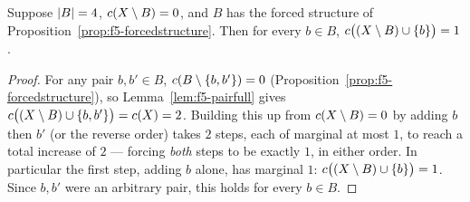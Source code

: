 \begin{proposition}
\label{prop:f5-case0}
Suppose $\left\lvert B\right\rvert = 4$, $c(X \setminus B) = 0$, and $B$ has the forced
structure of Proposition~\ref{prop:f5-forcedstructure}. Then for every
$b \in B$, $c\bigl((X \setminus B) \cup \left\{b\right\}\bigr) = 1$.
\end{proposition}

\begin{proof}
For any pair $b, b' \in B$, $c(B \setminus \left\{b,b'\right\}) = 0$
(Proposition~\ref{prop:f5-forcedstructure}), so
Lemma~\ref{lem:f5-pairfull} gives
$c\bigl((X\setminus B) \cup \left\{b,b'\right\}\bigr) = c(X) = 2$. Building this
up from $c(X \setminus B) = 0$ by adding $b$ then $b'$ (or the reverse
order) takes $2$ steps, each of marginal at most $1$, to reach a total
increase of $2$ --- forcing \emph{both} steps to be exactly $1$, in either
order. In particular the first step, adding $b$ alone, has marginal $1$:
$c\bigl((X\setminus B)\cup\left\{b\right\}\bigr) = 1$. Since $b,b'$ were an arbitrary
pair, this holds for every $b \in B$.
\end{proof}

